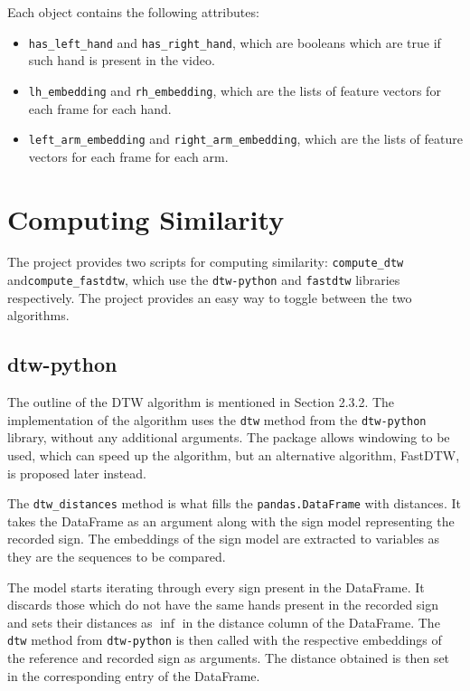 \documentclass[final,rdr32.tex]{subfiles}
\begin{document}
Each object contains the following attributes:

\begin{itemize}
    \item \verb|has_left_hand| and \verb|has_right_hand|, which are booleans which are true if such hand is present in the video.
    \item \verb|lh_embedding| and \verb|rh_embedding|, which are the lists of feature vectors for each frame for each hand.
    \item \verb|left_arm_embedding| and \verb|right_arm_embedding|, which are the lists of feature vectors for each frame for each arm.
\end{itemize}

\section{Computing Similarity}

The project provides two scripts for computing similarity: \verb|compute_dtw| and\newline \verb|compute_fastdtw|, which use the \verb|dtw-python|\cite{giorgino2009computing} and \verb|fastdtw| \cite{salvador2007toward} libraries respectively. The project provides an easy way to toggle between the two algorithms.

\subsection{dtw-python}
\label{sec:dtw-python}

The outline of the DTW algorithm is mentioned in Section 2.3.2. The implementation of the algorithm uses the \verb|dtw| method from the \verb|dtw-python| library, without any additional arguments. The package allows windowing to be used, which can speed up the algorithm, but an alternative algorithm, FastDTW, is proposed later instead.

The \verb|dtw_distances| method is what fills the \verb|pandas.DataFrame| with distances. It takes the DataFrame as an argument along with the sign model representing the recorded sign. The embeddings of the sign model are extracted to variables as they are the sequences to be compared.

The model starts iterating through every sign present in the DataFrame. It discards those which do not have the same hands present in the recorded sign and sets their distances as $\inf$ in the distance column of the DataFrame. The \verb|dtw| method from \verb|dtw-python| \cite{giorgino2009computing} is then called with the respective embeddings of the reference and recorded sign as arguments. The distance obtained is then set in the corresponding entry of the DataFrame.
\end{document}

